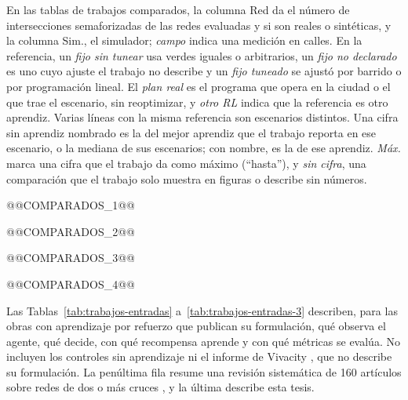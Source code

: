 En las tablas de trabajos comparados, la columna Red da el número de
intersecciones semaforizadas de las redes evaluadas y si son reales o
sintéticas, y la columna Sim., el simulador; \emph{campo} indica una
medición en calles. En la referencia, un \emph{fijo sin tunear} usa
verdes iguales o arbitrarios, un \emph{fijo no declarado} es uno cuyo
ajuste el trabajo no describe y un \emph{fijo tuneado} se ajustó por
barrido o por programación lineal. El \emph{plan real} es el programa
que opera en la ciudad o el que trae el escenario, sin reoptimizar, y
\emph{otro RL} indica que la referencia es otro aprendiz. Varias líneas
con la misma referencia son escenarios distintos. Una cifra sin
aprendiz nombrado es la del mejor aprendiz que el trabajo reporta en ese
escenario, o la mediana de sus escenarios; con nombre, es la de ese
aprendiz. \emph{Máx.} marca una cifra que el trabajo da como máximo
(``hasta''), y \emph{sin cifra}, una comparación que el trabajo solo
muestra en figuras o describe sin números.

@@COMPARADOS_1@@

@@COMPARADOS_2@@

@@COMPARADOS_3@@

@@COMPARADOS_4@@

Las Tablas~\ref{tab:trabajos-entradas} a~\ref{tab:trabajos-entradas-3}
describen, para las obras con aprendizaje por refuerzo que publican su
formulación, qué observa el agente, qué decide, con qué recompensa
aprende y con qué métricas se evalúa. No incluyen los controles sin
aprendizaje ni el informe de Vivacity \citep{Velasco2021_Vivacity}, que
no describe su formulación. La penúltima fila resume una revisión
sistemática de 160 artículos sobre redes de dos o más cruces
\citep{Noaeen2022_SLR}, y la última describe esta tesis.


